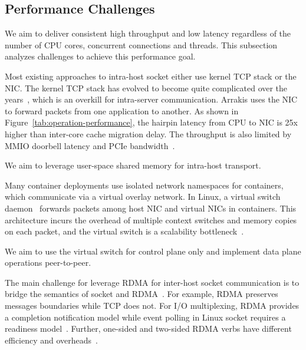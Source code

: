 \subsection{Performance Challenges}
\label{subsec:performance-challenges}

We aim to deliver consistent high throughput and low latency regardless of the number of CPU cores, concurrent connections and threads.
This subsection analyzes challenges to achieve this performance goal.

Most existing approaches to intra-host socket either use kernel TCP stack or the NIC.
The kernel TCP stack has evolved to become quite complicated over the years~\cite{yasukata2016stackmap}, which is an overkill 
for intra-server communication. %
Arrakis uses the NIC to forward packets from one application to another.
As shown in Figure~\ref{tab:operation-performance}, the hairpin latency from CPU to NIC is 25x higher than inter-core cache migration delay.
The throughput is also limited by MMIO doorbell latency and PCIe bandwidth~\cite{neugebauer2018understanding,li2017kv}.

We aim to leverage user-space shared memory for intra-host transport.

Many container deployments use isolated network namespaces for containers, which communicate via a virtual overlay network.
In Linux, a virtual switch daemon~\cite{pfaff2015design} forwards packets among host NIC and virtual NICs in containers.
This architecture incurs the overhead of multiple context switches and memory copies on each packet, and the virtual switch is a scalability bottleneck~\cite{pfefferle2015hybrid}.

We aim to use the virtual switch for control plane only and implement data plane operations peer-to-peer.

The main challenge for leverage RDMA for inter-host socket communication is to bridge the semantics of socket and RDMA~\cite{dragojevic2014farm}.
For example, RDMA preserves messages boundaries while TCP does not.
For I/O multiplexing, RDMA provides a completion notification model while event polling in Linux socket requires a readiness model~\cite{han2012megapipe}.
Further, one-sided and two-sided RDMA verbs have different efficiency and overheads~\cite{kalia2014using,kaminsky2016design}.

